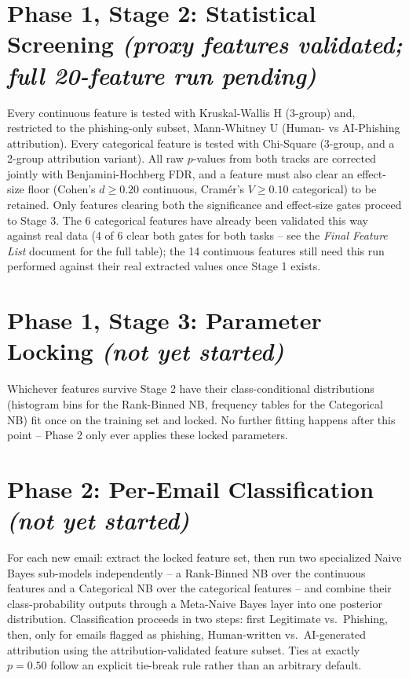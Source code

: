 \documentclass[11pt]{article}
\begin{document}
\section{Phase 1, Stage 2: Statistical Screening \textit{(proxy features validated; full 20-feature run pending)}}
Every continuous feature is tested with Kruskal-Wallis H (3-group) and, restricted to the phishing-only
subset, Mann-Whitney U (Human- vs AI-Phishing attribution). Every categorical feature is tested with
Chi-Square (3-group, and a 2-group attribution variant). All raw $p$-values from both tracks are
corrected jointly with Benjamini-Hochberg FDR, and a feature must also clear an effect-size floor
(Cohen's $d \geq 0.20$ continuous, Cram\'er's $V \geq 0.10$ categorical) to be retained. Only features
clearing both the significance and effect-size gates proceed to Stage 3. The 6 categorical features have
already been validated this way against real data (4 of 6 clear both gates for both tasks -- see the
\textit{Final Feature List} document for the full table); the 14 continuous features still need this run
performed against their real extracted values once Stage 1 exists.

\section{Phase 1, Stage 3: Parameter Locking \textit{(not yet started)}}
Whichever features survive Stage 2 have their class-conditional distributions (histogram bins for the
Rank-Binned NB, frequency tables for the Categorical NB) fit once on the training set and locked. No
further fitting happens after this point -- Phase 2 only ever applies these locked parameters.

\section{Phase 2: Per-Email Classification \textit{(not yet started)}}
For each new email: extract the locked feature set, then run two specialized Naive Bayes sub-models
independently -- a Rank-Binned NB over the continuous features and a Categorical NB over the categorical
features -- and combine their class-probability outputs through a Meta-Naive Bayes layer into one
posterior distribution. Classification proceeds in two steps: first Legitimate vs.\ Phishing, then, only
for emails flagged as phishing, Human-written vs.\ AI-generated attribution using the
attribution-validated feature subset. Ties at exactly $p=0.50$ follow an explicit tie-break rule rather
than an arbitrary default.
\end{document}
